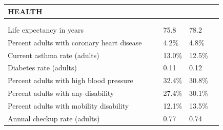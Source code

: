 \documentclass[9pt]{report}
\begin{document}
\newpage
\setlength{\tabcolsep}{.01in} %
\begin{tabular}{p{.10in}p{.10in}p{.10in}p{3.7in}>{\hfill}p{.85in}>{\hfill}p{.85in}>{\hfill}p{.85in}>{\hfill}p{.85in}p{0.1in}}
\multicolumn{9}{l}{\parbox{7.1in}{\raggedright{\large{\strut\textbf{HEALTH}\strut}}}} \\ 
\hline
\multicolumn{4}{l}{\parbox{3.5in}{\raggedright{\textbf{}}}} & \multicolumn{1}{r}{\parbox{.85in}{\strut\raggedleft{\textbf{}\strut}}} & \multicolumn{1}{r}{\parbox{.85in}{\strut\raggedleft{\textbf{}\strut}}} & \multicolumn{1}{r}{\parbox{.85in}{\strut{}}} & \multicolumn{1}{r}{\parbox{.85in}{\strut{}}} & \\ 
\multicolumn{9}{l}{} \\ 
\multicolumn{4}{l}{\parbox{3.6in}{\strut\raggedright{{Life expectancy in years}}\strut}} &  &  & 75.8 & 78.2 & \multicolumn{1}{l}{}  \\ 
\multicolumn{4}{l}{\parbox{3.6in}{\strut\raggedright{{Percent adults with coronary heart disease}}\strut}} &  &  & 4.2\% & 4.8\% & \multicolumn{1}{l}{}  \\ 
\multicolumn{4}{l}{\parbox{3.6in}{\strut\raggedright{{Current asthma rate (adults)}}\strut}} &  &  & 13.0\% & 12.5\% & \multicolumn{1}{l}{}  \\ 
\multicolumn{4}{l}{\parbox{3.6in}{\strut\raggedright{{Diabetes rate (adults)}}\strut}} &  &  & 0.11 & 0.12 & \multicolumn{1}{l}{}  \\ 
\multicolumn{4}{l}{\parbox{3.6in}{\strut\raggedright{{Percent adults with high blood pressure}}\strut}} &  &  & 32.4\% & 30.8\% & \multicolumn{1}{l}{}  \\ 
\multicolumn{4}{l}{\parbox{3.6in}{\strut\raggedright{{Percent adults with any disability}}\strut}} &  &  & 27.4\% & 30.1\% & \multicolumn{1}{l}{}  \\ 
\multicolumn{4}{l}{\parbox{3.6in}{\strut\raggedright{{Percent adults with mobility disability}}\strut}} &  &  & 12.1\% & 13.5\% & \multicolumn{1}{l}{}  \\ 
\multicolumn{4}{l}{\parbox{3.6in}{\strut\raggedright{{Annual checkup rate (adults)}}\strut}} &  &  & 0.77 & 0.74 & \multicolumn{1}{l}{}  \\ 

\end{tabular}
\end{document}
